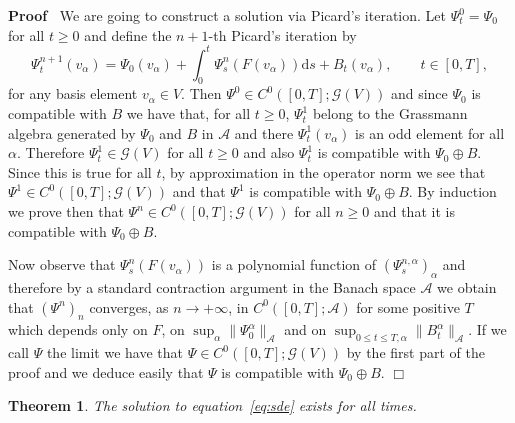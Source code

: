 \documentclass{article}
\newcommand{\mathd}{\mathrm{d}}
\newenvironment{proof}{\noindent\textbf{Proof\ }}{\hspace*{\fill}$\Box$\medskip}
\newtheorem{theorem}{Theorem}
\begin{document}
\begin{proof}
  We are going to construct a solution via Picard's iteration. Let $\Psi^0_t =
  \Psi_0$ for all $t \geqslant 0$ and define the $n + 1$-th Picard's iteration
  by
  \[ \Psi_t^{n + 1} (v_{\alpha}) = \Psi_0 (v_{\alpha}) + \int_0^t \Psi_s^n (F
     (v_{\alpha})) \mathd s + B_t (v_{\alpha}), \qquad t \in [0, T], \]
  for any basis element $v_{\alpha} \in V$. Then $\Psi^0 \in C^0 ([0, T] ;
  \mathcal{G} (V))$ and since $\Psi_0$ is compatible with $B$ we have that,
  for all $t \geqslant 0$, $\Psi^1_t$ belong to the Grassmann algebra
  generated by $\Psi_0$ and $B$ in $\mathcal{A}$ and there $\Psi^1_t
  (v_{\alpha})$ is an odd element for all $\alpha$. Therefore $\Psi^1_t \in
  \mathcal{G} (V)$ for all $t \geqslant 0$ and also $\Psi^1_t$ is compatible
  with $\Psi_0 \oplus B$. Since this is true for all $t$, by approximation in
  the operator norm we see that $\Psi^1 \in C^0 ([0, T] ; \mathcal{G} (V))$
  and that $\Psi^1$ is compatible with $\Psi_0 \oplus B$. By induction we
  prove then that $\Psi^n \in C^0 ([0, T] ; \mathcal{G} (V))$ for all $n
  \geqslant 0$ and that it is compatible with $\Psi_0 \oplus B$.
  
  Now observe that $\Psi_s^n (F (v_{\alpha}))$ is a polynomial function of
  $(\Psi^{n, \alpha}_s)_{\alpha}$ and therefore by a standard contraction
  argument in the Banach space $\mathcal{A}$ we obtain that $(\Psi^n)_n$
  converges, as $n \rightarrow + \infty$, in $C^0 ([0, T] ; \mathcal{A})$ for
  some positive $T$ which depends only on $F$, on $\sup_{\alpha} \|
  \Psi_0^{\alpha} \|_{\mathcal{A}}$ and on $\sup_{0 \leqslant t \leqslant T,
  \alpha} \| B_t^{\alpha} \|_{\mathcal{A}}$. If we call $\Psi$ the limit we
  have that $\Psi \in C^0 ([0, T] ; \mathcal{G} (V))$ by the first part of the
  proof and we deduce easily that $\Psi$ is compatible with $\Psi_0 \oplus B$.
\end{proof}

\begin{theorem}
  \label{th:global-sol}The solution to equation~{\eqref{eq:sde}} exists for
  all times.
\end{theorem}
\end{document}
